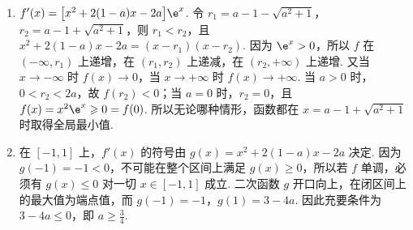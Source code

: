 \begin{solution}
\begin{enumerate}
\item
\(f'(x)=\bigl[x^2+2(1-a)x-2a\bigr]\e^x\). 令 \(r_1=a-1-\sqrt{a^2+1}\)，\(r_2=a-1+\sqrt{a^2+1}\)，则 \(r_1<r_2\)，且 \(x^2+2(1-a)x-2a=(x-r_1)(x-r_2)\).
因为 \(\e^x>0\)，所以 \(f\) 在 \((-\infty,r_1)\) 上递增，在 \((r_1,r_2)\) 上递减，在 \((r_2,+\infty)\) 上递增. 又当 \(x\to-\infty\) 时 \(f(x)\to0\)，当 \(x\to+\infty\) 时 \(f(x)\to+\infty\). 当 \(a>0\) 时，\(0<r_2<2a\)，故 \(f(r_2)<0\)；当 \(a=0\) 时，\(r_2=0\)，且 \(f(x)=x^2\e^x\geqslant0=f(0)\). 所以无论哪种情形，函数都在 \(x=a-1+\sqrt{a^2+1}\) 时取得全局最小值.
\item
在 \([-1,1]\) 上，\(f'(x)\) 的符号由 \(g(x)=x^2+2(1-a)x-2a\) 决定. 因为 \(g(-1)=-1<0\)，不可能在整个区间上满足 \(g(x)\geqslant0\)，所以若 \(f\) 单调，必须有 \(g(x)\leqslant0\) 对一切 \(x\in[-1,1]\) 成立. 二次函数 \(g\) 开口向上，在闭区间上的最大值为端点值，而 \(g(-1)=-1\)，\(g(1)=3-4a\).
因此充要条件为 \(3-4a\leqslant0\)，即 \(a\geqslant\frac34\).
\end{enumerate}
\end{solution}
